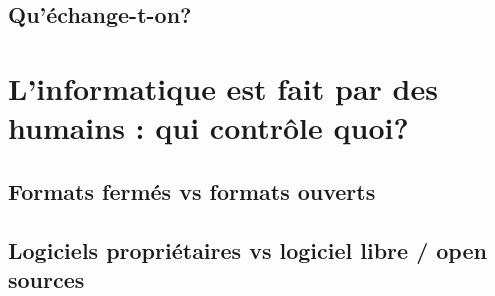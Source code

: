\documentclass{beamer}
\begin{document}
\subsection{Qu'échange-t-on?}%

\section{L'informatique est fait par des humains : qui contrôle quoi?}
\subsection{Formats fermés vs formats ouverts}
\subsection{Logiciels propriétaires vs logiciel libre / open sources} %
\end{document}
